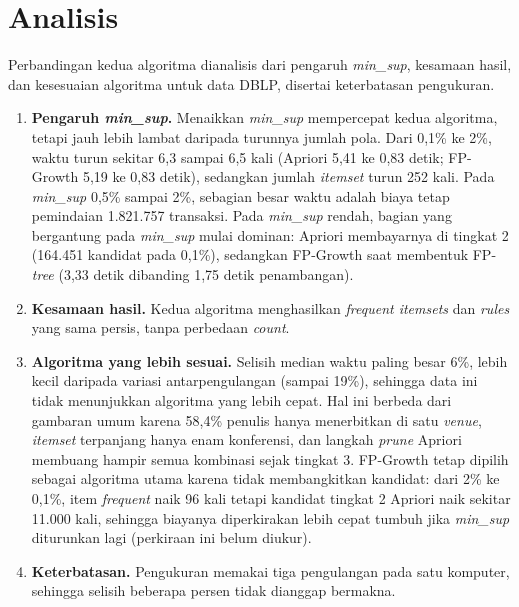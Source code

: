 \section{Analisis}
\label{sec:hasil-t6-analisis}
Perbandingan kedua algoritma dianalisis dari pengaruh \textit{min\_sup}, kesamaan hasil, dan kesesuaian algoritma untuk data DBLP, disertai keterbatasan pengukuran.
\begin{enumerate}
\item \textbf{Pengaruh \textit{min\_sup}.} Menaikkan \textit{min\_sup} mempercepat kedua algoritma, tetapi jauh lebih lambat daripada turunnya jumlah pola. Dari 0,1\% ke 2\%, waktu turun sekitar 6,3 sampai 6,5 kali (Apriori 5,41 ke 0,83 detik; FP-Growth 5,19 ke 0,83 detik), sedangkan jumlah \textit{itemset} turun 252 kali. Pada \textit{min\_sup} 0,5\% sampai 2\%, sebagian besar waktu adalah biaya tetap pemindaian 1.821.757 transaksi. Pada \textit{min\_sup} rendah, bagian yang bergantung pada \textit{min\_sup} mulai dominan: Apriori membayarnya di tingkat 2 (164.451 kandidat pada 0,1\%), sedangkan FP-Growth saat membentuk FP-\textit{tree} (3,33 detik dibanding 1,75 detik penambangan).
\item \textbf{Kesamaan hasil.} Kedua algoritma menghasilkan \textit{frequent itemsets} dan \textit{rules} yang sama persis, tanpa perbedaan \textit{count}.
\item \textbf{Algoritma yang lebih sesuai.} Selisih median waktu paling besar 6\%, lebih kecil daripada variasi antarpengulangan (sampai 19\%), sehingga data ini tidak menunjukkan algoritma yang lebih cepat. Hal ini berbeda dari gambaran umum karena 58,4\% penulis hanya menerbitkan di satu \textit{venue}, \textit{itemset} terpanjang hanya enam konferensi, dan langkah \textit{prune} Apriori membuang hampir semua kombinasi sejak tingkat 3. FP-Growth tetap dipilih sebagai algoritma utama karena tidak membangkitkan kandidat: dari 2\% ke 0,1\%, item \textit{frequent} naik 96 kali tetapi kandidat tingkat 2 Apriori naik sekitar 11.000 kali, sehingga biayanya diperkirakan lebih cepat tumbuh jika \textit{min\_sup} diturunkan lagi (perkiraan ini belum diukur).
\item \textbf{Keterbatasan.} Pengukuran memakai tiga pengulangan pada satu komputer, sehingga selisih beberapa persen tidak dianggap bermakna.
\end{enumerate}
